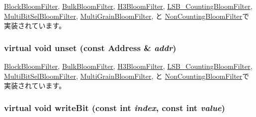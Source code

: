 \hyperlink{classBlockBloomFilter_a2b666fae2a5c2b98bc5cba8e1333bcc9}{BlockBloomFilter}, \hyperlink{classBulkBloomFilter_a2b666fae2a5c2b98bc5cba8e1333bcc9}{BulkBloomFilter}, \hyperlink{classH3BloomFilter_a2b666fae2a5c2b98bc5cba8e1333bcc9}{H3BloomFilter}, \hyperlink{classLSB__CountingBloomFilter_a2b666fae2a5c2b98bc5cba8e1333bcc9}{LSB\_\-CountingBloomFilter}, \hyperlink{classMultiBitSelBloomFilter_a2b666fae2a5c2b98bc5cba8e1333bcc9}{MultiBitSelBloomFilter}, \hyperlink{classMultiGrainBloomFilter_a2b666fae2a5c2b98bc5cba8e1333bcc9}{MultiGrainBloomFilter}, と \hyperlink{classNonCountingBloomFilter_a2b666fae2a5c2b98bc5cba8e1333bcc9}{NonCountingBloomFilter}で実装されています。\hypertarget{classAbstractBloomFilter_a0a35d1c7bad19fe9362068a0d319ec5f}{
\subsubsection[{unset}]{\setlength{\rightskip}{0pt plus 5cm}virtual void unset (const {\bf Address} \& {\em addr})}}
\label{classAbstractBloomFilter_a0a35d1c7bad19fe9362068a0d319ec5f}


\hyperlink{classBlockBloomFilter_a69b772787ea61467af679e3aa5406b41}{BlockBloomFilter}, \hyperlink{classBulkBloomFilter_a69b772787ea61467af679e3aa5406b41}{BulkBloomFilter}, \hyperlink{classH3BloomFilter_a69b772787ea61467af679e3aa5406b41}{H3BloomFilter}, \hyperlink{classLSB__CountingBloomFilter_a69b772787ea61467af679e3aa5406b41}{LSB\_\-CountingBloomFilter}, \hyperlink{classMultiBitSelBloomFilter_a69b772787ea61467af679e3aa5406b41}{MultiBitSelBloomFilter}, \hyperlink{classMultiGrainBloomFilter_a69b772787ea61467af679e3aa5406b41}{MultiGrainBloomFilter}, と \hyperlink{classNonCountingBloomFilter_a69b772787ea61467af679e3aa5406b41}{NonCountingBloomFilter}で実装されています。\hypertarget{classAbstractBloomFilter_a961813caf7bb3aece26914ac43c6293f}{
\subsubsection[{writeBit}]{\setlength{\rightskip}{0pt plus 5cm}virtual void writeBit (const int {\em index}, \/  const int {\em value})}}
\label{classAbstractBloomFilter_a961813caf7bb3aece26914ac43c6293f}


